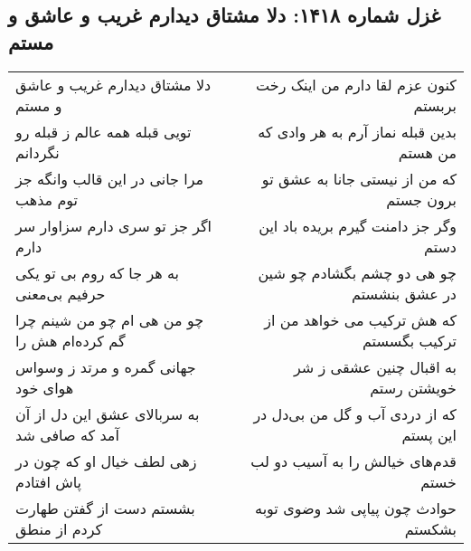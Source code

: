 \begin{center}
\section*{غزل شماره ۱۴۱۸: دلا مشتاق دیدارم غریب و عاشق و مستم}
\label{sec:1418}
\begin{longtable}{l p{0.5cm} r}
دلا مشتاق دیدارم غریب و عاشق و مستم
&&
کنون عزم لقا دارم من اینک رخت بربستم
\\
تویی قبله همه عالم ز قبله رو نگردانم
&&
بدین قبله نماز آرم به هر وادی که من هستم
\\
مرا جانی در این قالب وانگه جز توم مذهب
&&
که من از نیستی جانا به عشق تو برون جستم
\\
اگر جز تو سری دارم سزاوار سر دارم
&&
وگر جز دامنت گیرم بریده باد این دستم
\\
به هر جا که روم بی تو یکی حرفیم بی‌معنی
&&
چو هی دو چشم بگشادم چو شین در عشق بنشستم
\\
چو من هی ام چو من شینم چرا گم کرده‌ام هش را
&&
که هش ترکیب می خواهد من از ترکیب بگسستم
\\
جهانی گمره و مرتد ز وسواس هوای خود
&&
به اقبال چنین عشقی ز شر خویشتن رستم
\\
به سربالای عشق این دل از آن آمد که صافی شد
&&
که از دردی آب و گل من بی‌دل در این پستم
\\
زهی لطف خیال او که چون در پاش افتادم
&&
قدم‌های خیالش را به آسیب دو لب خستم
\\
بشستم دست از گفتن طهارت کردم از منطق
&&
حوادث چون پیاپی شد وضوی توبه بشکستم
\\
\end{longtable}
\end{center}
